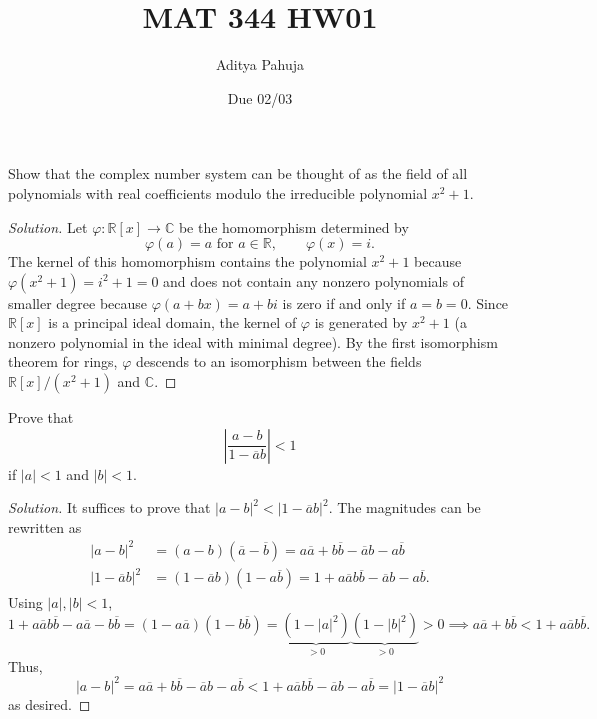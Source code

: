 \documentclass[10pt]{article}
\title{MAT 344 HW01}
\author{\large Aditya Pahuja}
\date{\large Due 02/03}
\providecommand{\ol}{\overline}
\providecommand{\CC}{\mathbb C}
\providecommand{\RR}{\mathbb R}
\newenvironment{soln}{\begin{proof}[Solution]}{\end{proof}}
\providecommand{\abs}[1]{\left\lvert #1\right\rvert}
\begin{document}
\maketitle

\begin{problem}
    [p.6\#2]
    Show that the complex number system can be thought of as
    the field of all polynomials with real coefficients
    modulo the irreducible polynomial $x^2 + 1$.
\end{problem}

\begin{soln}
    Let $\varphi\colon\RR[x]\to\CC$ be the homomorphism determined by
    \begin{equation*}
	\varphi(a) = a\text{ for }a\in\RR,\qquad
	\varphi(x) = i.
    \end{equation*}
    The kernel of this homomorphism contains
    the polynomial $x^2 + 1$ because $\varphi(x^2 + 1) = i^2 + 1 = 0$
    and does not contain any nonzero polynomials of smaller degree because
    $\varphi(a + bx) = a + bi$ is zero if and only if $a=b=0$.
    Since $\RR[x]$ is a principal ideal domain,
    the kernel of $\varphi$ is generated by $x^2 + 1$
    (a nonzero polynomial in the ideal with minimal degree).
    By the first isomorphism theorem for rings,
    $\varphi$ descends to an isomorphism
    between the fields $\RR[x]/(x^2 + 1)$ and $\CC$.
\end{soln}

\begin{problem}
    [p.11\#1]
    Prove that
    \begin{equation*}
	\abs{\frac{a-b}{1-\ol ab}} < 1
    \end{equation*}
    if $\abs a < 1$ and $\abs b < 1$.
\end{problem}

\begin{soln}
    It suffices to prove that $\abs{a-b}^2 < \abs{1-\ol ab}^2$.
    The magnitudes can be rewritten as
    \begin{align*}
        \abs{a-b}^2
	&= (a-b)(\ol a-\ol b) = a\ol a + b\ol b - \ol ab - a\ol b\\
        \abs{1-\ol ab}^2
	&= (1-\ol ab)(1-a\ol b) = 1 + a\ol ab\ol b - \ol ab - a\ol b.
    \end{align*}
    Using $\abs a,\abs b<1$,
    \begin{equation*}
	1 + a\ol ab\ol b - a\ol a-b\ol b
	= (1 - a\ol a)(1 - b\ol b)
	= \underbrace{(1 - \abs a^2)}_{>0}\underbrace{(1 - \abs b^2)}_{>0} > 0
	\implies a\ol a + b\ol b < 1 + a\ol ab\ol b.
    \end{equation*}
    Thus,
    \begin{equation*}
	\abs{a-b}^2
	= a\ol a + b\ol b - \ol ab - a\ol b
	< 1 + a\ol ab\ol b - \ol ab - a\ol b
	= \abs{1-\ol ab}^2
    \end{equation*}
    as desired.
\end{soln}
\end{document}

